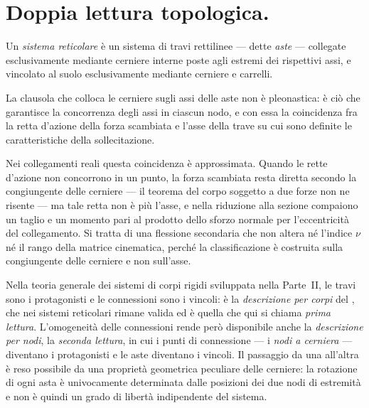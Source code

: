 \section{Doppia lettura topologica.}
\label{sec:doppia_lettura}
Un \emph{sistema reticolare} è un sistema di travi
rettilinee --- dette \emph{aste} --- collegate
esclusivamente mediante cerniere interne poste agli estremi dei rispettivi assi, e vincolato
al suolo esclusivamente mediante cerniere e carrelli.

\begin{oss}\label{oss:cerniera_su_asse}
		La clausola che colloca le cerniere sugli assi delle aste
		non è pleonastica: è ciò che garantisce la concorrenza
		degli assi in ciascun nodo, e con essa la coincidenza fra
		la retta d'azione della forza scambiata e l'asse della
		trave su cui sono definite le caratteristiche della
		sollecitazione.
		
		Nei collegamenti reali questa coincidenza è approssimata.
		Quando le rette d'azione non concorrono in un punto, la
		forza scambiata resta diretta secondo la congiungente
		delle cerniere --- il teorema del corpo soggetto a due
		forze non ne risente --- ma tale retta non è più l'asse,
		e nella riduzione alla sezione compaiono un taglio e un
		momento pari al prodotto dello sforzo normale per
		l'eccentricità del collegamento. Si tratta di una
		flessione secondaria che non altera né l'indice $\nu$ né
		il rango della matrice cinematica, perché la
		classificazione è costruita sulla congiungente delle
		cerniere e non sull'asse.
\end{oss}


Nella teoria generale dei sistemi di corpi rigidi
sviluppata nella Parte~II, le travi sono i
protagonisti e le connessioni sono i vincoli: è la
\emph{descrizione per corpi} del
, che nei sistemi
reticolari rimane valida ed è quella che qui si chiama
\emph{prima lettura}. L'omogeneità delle connessioni
rende però disponibile anche la \emph{descrizione per
	nodi}, la \emph{seconda lettura}, in cui i punti di
connessione --- i \emph{nodi a cerniera} --- diventano
i protagonisti e le aste diventano i vincoli. Il
passaggio da una all'altra è reso possibile da una
proprietà geometrica peculiare delle cerniere: la
rotazione di ogni asta è univocamente determinata dalle
posizioni dei due nodi di estremità e non è quindi un
grado di libertà indipendente del sistema.


